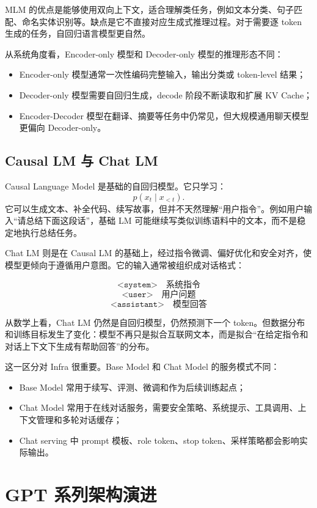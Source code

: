MLM 的优点是能够使用双向上下文，适合理解类任务，例如文本分类、句子匹配、命名实体识别等。缺点是它不直接对应生成式推理过程。对于需要逐 token 生成的任务，自回归语言模型更自然。

从系统角度看，Encoder-only 模型和 Decoder-only 模型的推理形态不同：

\begin{itemize}
\item Encoder-only 模型通常一次性编码完整输入，输出分类或 token-level 结果；
\item Decoder-only 模型需要自回归生成，decode 阶段不断读取和扩展 KV Cache；
\item Encoder-Decoder 模型在翻译、摘要等任务中仍常见，但大规模通用聊天模型更偏向 Decoder-only。
\end{itemize}

\subsection{Causal LM 与 Chat LM}
\label{subsec:causal-lm-and-chat-lm}

Causal Language Model 是基础的自回归模型。它只学习：
\[
p(x_t\mid x_{<t}).
\]
它可以生成文本、补全代码、续写故事，但并不天然理解“用户指令”。例如用户输入“请总结下面这段话”，基础 LM 可能继续写类似训练语料中的文本，而不是稳定地执行总结任务。

Chat LM 则是在 Causal LM 的基础上，经过指令微调、偏好优化和安全对齐，使模型更倾向于遵循用户意图。它的输入通常被组织成对话格式：

\[
\texttt{<system>} \quad \text{系统指令}
\]
\[
\texttt{<user>} \quad \text{用户问题}
\]
\[
\texttt{<assistant>} \quad \text{模型回答}
\]

从数学上看，Chat LM 仍然是自回归模型，仍然预测下一个 token。但数据分布和训练目标发生了变化：模型不再只是拟合互联网文本，而是拟合“在给定指令和对话上下文下生成有帮助回答”的分布。

这一区分对 Infra 很重要。Base Model 和 Chat Model 的服务模式不同：

\begin{itemize}
\item Base Model 常用于续写、评测、微调和作为后续训练起点；
\item Chat Model 常用于在线对话服务，需要安全策略、系统提示、工具调用、上下文管理和多轮对话缓存；
\item Chat serving 中 prompt 模板、role token、stop token、采样策略都会影响实际输出。
\end{itemize}

\section{GPT 系列架构演进}
\label{sec:gpt-family-evolution}

